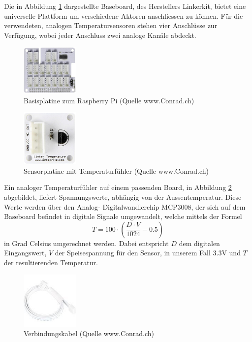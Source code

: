 Die in Abbildung \ref{fig:plate} dargestellte Baseboard, des Herstellers Linkerkit, bietet eine universelle Plattform um verschiedene Aktoren anschliessen zu können. Für die verwendeten, analogen Temperatursensoren stehen vier Anschlüsse zur Verfügung, wobei jeder Anschluss zwei analoge Kanäle abdeckt.

\begin{figure}[H]%
\centering
\includegraphics[width=0.25\textwidth]{Images/Basisplatine.jpg}
\caption{Basisplatine zum Raspberry Pi (Quelle www.Conrad.ch)}
\label{fig:plate}
\end{figure}

\begin{figure}[H]%
\centering
\includegraphics[width=0.25\textwidth]{Images/Sensorplatine.jpg}
\caption{Sensorplatine mit Temperaturfühler (Quelle www.Conrad.ch)}
\label{fig:sensor}
\end{figure}

Ein analoger Temperaturfühler auf einem passenden Board, in Abbildung \ref{fig:sensor} abgebildet, liefert Spannungswerte, abhängig von der Aussentemperatur. Diese Werte werden über den Analog- Digitalwandlerchip MCP3008, der sich auf dem Baseboard befindet in digitale Signale umgewandelt, welche mittels der Formel
\[
	T = 100 \cdot \left( \frac{D \cdot V}{1024} - 0.5 \right) 
\]
in Grad Celsius umgerechnet werden. Dabei entspricht $D$ dem digitalen Eingangswert, $V$ der Speisespannung für den Sensor, in unserem Fall 3.3V und $T$ der resultierenden Temperatur.

\begin{figure}[H]%
\centering
\includegraphics[width=0.25\textwidth]{Images/Verbindungskabel.jpg}
\caption{Verbindungskabel (Quelle www.Conrad.ch)}
\label{fig:cable}
\end{figure}

